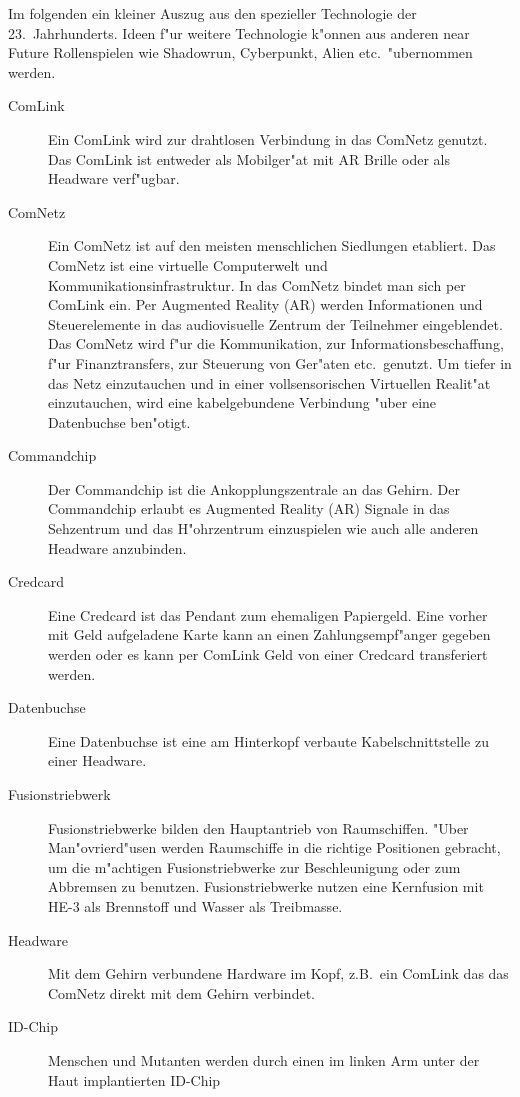 Im folgenden ein kleiner Auszug aus den spezieller Technologie der 23.~Jahrhunderts. Ideen f"ur weitere Technologie k"onnen aus anderen near Future Rollenspielen wie Shadowrun, Cyberpunkt, Alien etc.~"ubernommen werden.

\begin{description}
\item [ComLink] Ein ComLink wird zur drahtlosen Verbindung in das ComNetz genutzt. Das ComLink ist entweder als
      Mobilger"at mit AR Brille oder als Headware verf"ugbar.
\item [ComNetz] Ein ComNetz ist auf den meisten menschlichen Siedlungen etabliert. Das ComNetz ist eine virtuelle
      Computerwelt und Kommunikationsinfrastruktur. In das ComNetz bindet man sich per ComLink ein. Per Augmented Reality (AR) werden Informationen und Steuerelemente in das audiovisuelle Zentrum der Teilnehmer eingeblendet. Das ComNetz wird f"ur die Kommunikation, zur Informationsbeschaffung, f"ur Finanztransfers, zur Steuerung von Ger"aten etc.~genutzt. Um tiefer in das Netz einzutauchen und in einer vollsensorischen Virtuellen Realit"at einzutauchen, wird eine kabelgebundene Verbindung "uber eine Datenbuchse ben"otigt.
\item [Commandchip] Der Commandchip ist die Ankopplungszentrale an das Gehirn. Der Commandchip erlaubt es Augmented Reality (AR) Signale in     das Sehzentrum und das H"ohrzentrum einzuspielen wie auch alle anderen Headware anzubinden.
\item [Credcard] Eine Credcard ist das Pendant zum ehemaligen Papiergeld. Eine vorher mit Geld aufgeladene Karte kann an
      einen Zahlungsempf"anger gegeben werden oder es kann per ComLink Geld von einer Credcard transferiert werden.
\item [Datenbuchse] Eine Datenbuchse ist eine am Hinterkopf verbaute Kabelschnittstelle zu einer Headware.
\item [Fusionstriebwerk] Fusionstriebwerke bilden den Hauptantrieb von Raumschiffen. "Uber Man"ovrierd"usen werden
      Raumschiffe in die richtige Positionen gebracht, um die m"achtigen Fusionstriebwerke zur Beschleunigung oder zum Abbremsen zu benutzen. Fusionstriebwerke nutzen eine Kernfusion mit HE-3 als Brennstoff und Wasser als Treibmasse.
\item [Headware] Mit dem Gehirn verbundene Hardware im Kopf, z.B.~ein ComLink das das ComNetz direkt mit dem Gehirn
      verbindet.
\item [ID-Chip] Menschen und Mutanten werden durch einen im linken Arm unter der Haut implantierten ID-Chip

\end{description}

